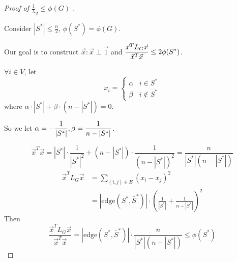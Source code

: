 \begin{proof}[Proof of  $\frac 1 \lambda_2 \leq \phi(G) $ ]
    \,


    Consider  $ |S^*| \leq \frac{n}{2} $,  $ \phi(S^*)=\phi(G) $.
    
    Our goal is to construct  $ \vec{x}:\vec{x}\perp \vec{1} $ and  $ \displaystyle\frac{\vec{x}^TL_G\vec{x}}{\vec{x}^T\vec{x}} \leq 2\phi(S^*) $.
    
    $ \forall i\in V $, let
    \[x_i=\begin{cases}
        \alpha&i\in S^*\\
        \beta&i\not\in S^*
    \end{cases}\] 
    where  $ \alpha\cdot |S^*|+\beta\cdot (n-|S^*|) =0 $.

    So we let  $ \alpha=-\displaystyle\frac{1}{|S^*|},\beta=\frac{1}{n-|S^*|} $.
    
    
    \[\vec{x}^T\vec{x}=|S^*|\cdot\frac{1}{|S^*|^2}+(n-|S^*|)\cdot\frac{1}{(n-|S^*|)^2}=\frac{n}{|S^*|(n-|S^*|)}\]
    \[\begin{aligned}
        \vec{x}^TL_G\vec{x}&=\sum_{(i,j)\in E}(x_i-x_j)^2\\
        &=\left|\mathrm{edge}(S^*,\bar{S}^*)\right|\cdot\left(\frac{1}{|S^*|}+\frac{1}{n-|S^*|}\right)^2
    \end{aligned}\]
    Then 
    \[\frac{\vec{x}^TL_G\vec{x}}{\vec{x}^T\vec{x}}=|\mathrm{edge}(S^*,\bar{S}^*)|\cdot\frac{n}{|S^*|(n-|S^*|)}  \leq \phi(S^*)\]

\end{proof}

